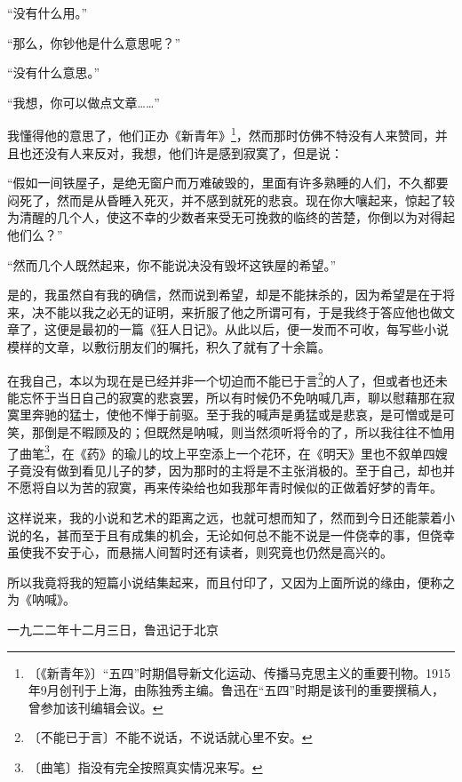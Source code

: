 \documentclass[12pt,UTF-8,openany]{ctexbook}
\begin{document}
\begin{normalsize}
    “没有什么用。”
    
    “那么，你钞他是什么意思呢？”
    
    “没有什么意思。”
    
    “我想，你可以做点文章……”
    
    我懂得他的意思了，他们正办《新青年》\footnote{〔《新青年》〕“五四”时期倡导新文化运动、传播马克思主义的重要刊物。1915年9月创刊于上海，由陈独秀主编。鲁迅在“五四”时期是该刊的重要撰稿人，曾参加该刊编辑会议。}，然而那时仿佛不特没有人来赞同，并且也还没有人来反对，我想，他们许是感到寂寞了，但是说：
    
    “假如一间铁屋子，是绝无窗户而万难破毁的，里面有许多熟睡的人们，不久都要闷死了，然而是从昏睡入死灭，并不感到就死的悲哀。现在你大嚷起来，惊起了较为清醒的几个人，使这不幸的少数者来受无可挽救的临终的苦楚，你倒以为对得起他们么？”
    
    “然而几个人既然起来，你不能说决没有毁坏这铁屋的希望。”
    
    是的，我虽然自有我的确信，然而说到希望，却是不能抹杀的，因为希望是在于将来，决不能以我之必无的证明，来折服了他之所谓可有，于是我终于答应他也做文章了，这便是最初的一篇《狂人日记》。从此以后，便一发而不可收，每写些小说模样的文章，以敷衍朋友们的嘱托，积久了就有了十余篇。
    
    在我自己，本以为现在是已经并非一个切迫而不能已于言\footnote{〔不能已于言〕不能不说话，不说话就心里不安。}的人了，但或者也还未能忘怀于当日自己的寂寞的悲哀罢，所以有时候仍不免呐喊几声，聊以慰藉那在寂寞里奔驰的猛士，使他不惮于前驱。至于我的喊声是勇猛或是悲哀，是可憎或是可笑，那倒是不暇顾及的；但既然是呐喊，则当然须听将令的了，所以我往往不恤用了曲笔\footnote{〔曲笔〕指没有完全按照真实情况来写。}，在《药》的瑜儿的坟上平空添上一个花环，在《明天》里也不叙单四嫂子竟没有做到看见儿子的梦，因为那时的主将是不主张消极的。至于自己，却也并不愿将自以为苦的寂寞，再来传染给也如我那年青时候似的正做着好梦的青年。
    
    这样说来，我的小说和艺术的距离之远，也就可想而知了，然而到今日还能蒙着小说的名，甚而至于且有成集的机会，无论如何总不能不说是一件侥幸的事，但侥幸虽使我不安于心，而悬揣人间暂时还有读者，则究竟也仍然是高兴的。
    
    所以我竟将我的短篇小说结集起来，而且付印了，又因为上面所说的缘由，便称之为《呐喊》。
    
    \hfill 一九二二年十二月三日，鲁迅记于北京
    
\end{normalsize}


\newpage
\end{document}
